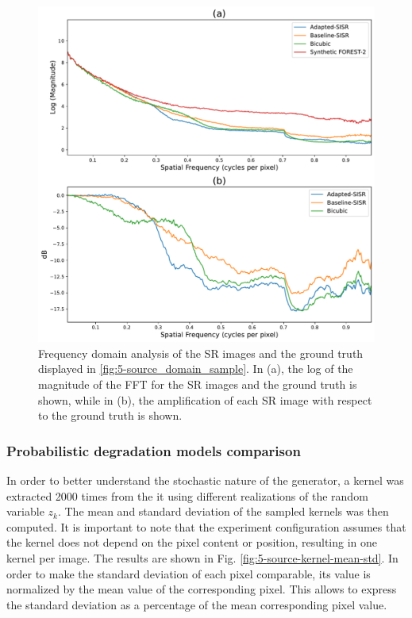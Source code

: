         \begin{figure}[H]
            \centering
            \includegraphics[scale=0.5]{Includes/5-source-sr-fft-comparison.pdf}
            \caption{Frequency domain analysis of the SR images and the ground truth displayed in \ref{fig:5-source_domain_sample}.
                     In (a), the log of the magnitude of the FFT for the SR images and the ground truth is shown,
                     while in (b), the amplification of each SR image with respect to the ground truth is shown.}
            \label{fig:5-source-sr-fft-comparison}
        \end{figure}

        \subsubsection{Probabilistic degradation models comparison}

        In order to better understand the stochastic nature of the generator, a kernel was extracted 2000 times from the it using different realizations of the random variable $z_k$.
        The mean and standard deviation of the sampled kernels was then computed.
        It is important to note that the experiment configuration assumes that the kernel does not depend on the pixel content or position, resulting in one kernel per image.
        The results are shown in Fig. \ref{fig:5-source-kernel-mean-std}. 
        In order to make the standard deviation of each pixel comparable, its value is normalized by the mean value of the corresponding pixel. 
        This allows to express the standard deviation as a percentage of the mean corresponding pixel value.
        
